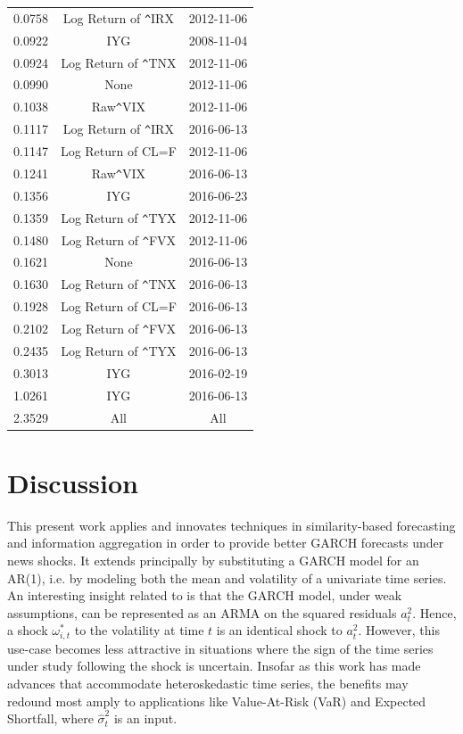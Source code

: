 \documentclass{uiucthesis2021}
\theoremstyle{definition}
\begin{document}
\begin{table}[ht]
\begin{tabular}{ccc}
      0.0758 & Log Return of \verb|^|IRX & 2012-11-06 \\ 
      0.0922 & IYG & 2008-11-04 \\ 
      0.0924 & Log Return of \verb|^|TNX & 2012-11-06 \\ 
      0.0990 & None & 2012-11-06 \\ 
      0.1038 & Raw\verb|^|VIX & 2012-11-06 \\ 
      0.1117 & Log Return of \verb|^|IRX & 2016-06-13 \\ 
      0.1147 & Log Return of CL=F & 2012-11-06 \\ 
      0.1241 & Raw\verb|^|VIX & 2016-06-13 \\ 
      0.1356 & IYG & 2016-06-23 \\ 
      0.1359 & Log Return of \verb|^|TYX & 2012-11-06 \\ 
      0.1480 & Log Return of \verb|^|FVX & 2012-11-06 \\ 
      0.1621 & None & 2016-06-13 \\ 
      0.1630 & Log Return of \verb|^|TNX & 2016-06-13 \\ 
      0.1928 & Log Return of CL=F & 2016-06-13 \\ 
      0.2102 & Log Return of \verb|^|FVX & 2016-06-13 \\ 
      0.2435 & Log Return of \verb|^|TYX & 2016-06-13 \\ 
      0.3013 & IYG & 2016-02-19 \\ 
      1.0261 & IYG & 2016-06-13 \\
      \rowcolor{red} 2.3529 & All & All \\ 
       \hline
    \end{tabular}
    \endgroup
    \end{table}\label{multiverse_table}

\section{Discussion}

This present work applies and innovates techniques in similarity-based forecasting and information aggregation in order to provide better GARCH forecasts under news shocks.  It extends \cite[][]{lin2021minimizing} principally by substituting a GARCH model for an AR(1), i.e. by modeling both the mean and volatility of a univariate time series.  An interesting insight related to \cite[][]{lin2021minimizing} is that the GARCH model, under weak assumptions, can be represented as an ARMA on the squared residuals $a^{2}_{t}$.  Hence, a shock $\omega^{*}_{i,t}$ to the volatility at time $t$ is an identical shock to $a^{2}_{t}$. However, this use-case becomes less attractive in situations where the sign of the time series under study following the shock is uncertain.  Insofar as this work has made advances that accommodate heteroskedastic time series, the benefits may redound most amply to applications like Value-At-Risk (VaR) and Expected Shortfall, where $\hat\sigma^{2}_{t}$ is an input.
\end{document}
